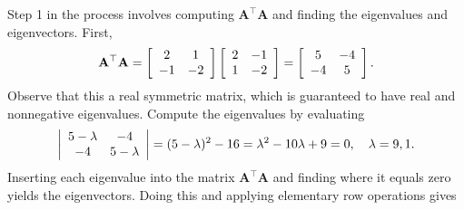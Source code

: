 Step 1 in the process involves computing $\mathbf{A}^\top \mathbf{A}$ and finding the eigenvalues and eigenvectors. First,
\begin{align}
  \mathbf{A}^\top \mathbf{A} = 
   \left[ \begin{array}{c c}
    2 &  1 \\
   -1 & -2 \\ \end{array} \right]
   \left[ \begin{array}{c c}
   2 & -1 \\
   1 & -2 \\ \end{array} \right] =
   \left[ \begin{array}{c c}
    5 & -4 \\
   -4 &  5 \\ \end{array} \right] .    
\end{align}
Observe that this a real symmetric matrix, which is guaranteed to have real and nonnegative eigenvalues. Compute the eigenvalues by evaluating
\begin{align}
   \left| \begin{array}{c c}
    5 - \lambda & -4 			\\
   -4 			&  5 - \lambda 	\\ \end{array} \right| = ( 5 - \lambda )^2 - 16 = \lambda^2 - 10 \lambda + 9 = 0, \quad \lambda = 9, 1.
\end{align}
Inserting each eigenvalue into the matrix $\mathbf{A}^\top \mathbf{A}$ and finding where it equals zero yields the eigenvectors. Doing this and applying elementary row operations gives
